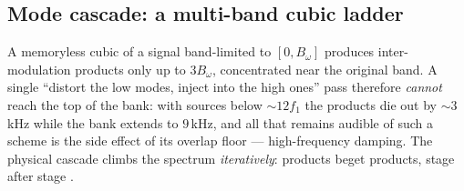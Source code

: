 \documentclass[11pt,a4paper]{article}
\begin{document}
\subsection{Mode cascade: a multi-band cubic ladder}
\label{sec:cascade}

A memoryless cubic of a signal band-limited to $[0, B_\omega]$ produces
inter-modulation products only up to $3 B_\omega$, concentrated near the
original band. A single ``distort the low modes, inject into the high
ones'' pass therefore \emph{cannot} reach the top of the bank: with
sources below $\sim\!12 f_1$ the products die out by $\sim\!3$\,kHz while
the bank extends to $9$\,kHz, and all that remains audible of such a
scheme is the side effect of its overlap floor --- high-frequency damping.
The physical cascade climbs the spectrum \emph{iteratively}: products
beget products, stage after stage \cite{touze-turbulence}.
\end{document}
